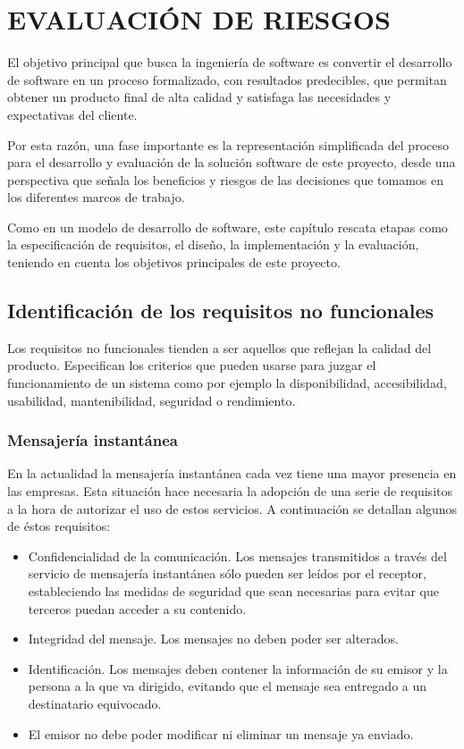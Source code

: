 \chapter{EVALUACIÓN DE RIESGOS\label{sec:disenho}}

El objetivo principal que busca la ingeniería de software es convertir el desarrollo de software en un proceso formalizado, con resultados predecibles, que permitan obtener un producto final de alta calidad y satisfaga las necesidades y expectativas del cliente.

Por esta razón, una fase importante es la representación simplificada del proceso para el desarrollo y evaluación de la solución software de este proyecto, desde una perspectiva que señala los beneficios y riesgos de las decisiones que tomamos en los diferentes marcos de trabajo.

Como en un modelo de desarrollo de software, este capítulo rescata etapas como la especificación de requisitos, el diseño, la implementación y la evaluación, teniendo en cuenta los objetivos principales de este proyecto.

\clearpage

\section{Identificación de los requisitos no funcionales}

Los requisitos no funcionales tienden a ser aquellos que reflejan la calidad del producto. Especifican los criterios que pueden usarse para juzgar el funcionamiento de un sistema como por ejemplo la disponibilidad, accesibilidad, usabilidad, mantenibilidad, seguridad o rendimiento.

\subsection{Mensajería instantánea}

En la actualidad la mensajería instantánea cada vez tiene una mayor presencia en las empresas. Esta situación hace necesaria la adopción de una serie de requisitos a la hora de autorizar el uso de estos servicios. A continuación se detallan algunos de éstos requisitos:

\begin{itemize}
  \item Confidencialidad de la comunicación. Los mensajes transmitidos a través del servicio de mensajería instantánea sólo pueden ser leídos por el receptor, estableciendo las medidas de seguridad que sean necesarias para evitar que terceros puedan acceder a su contenido.
  \item Integridad del mensaje. Los mensajes no deben poder ser alterados.
  \item Identificación. Los mensajes deben contener la información de su emisor y la persona a la que va dirigido, evitando que el mensaje sea entregado a un destinatario equivocado.
  \item El emisor no debe poder modificar ni eliminar un mensaje ya enviado.
\end{itemize}

